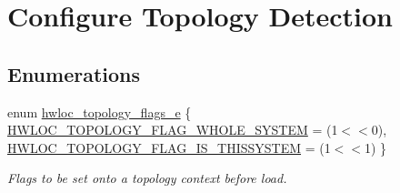 \hypertarget{group__hwlocality__configuration}{
\section{Configure Topology Detection}
\label{group__hwlocality__configuration}
}
\subsection*{Enumerations}
\begin{CompactItemize}
\item 
enum \hyperlink{group__hwlocality__configuration_gda025d3ec20b4b420f8038d23d6e7bde}{hwloc\_\-topology\_\-flags\_\-e} \{ \hyperlink{group__hwlocality__configuration_ggda025d3ec20b4b420f8038d23d6e7bde129b4fea1300be22bbaf0bb0958994c8}{HWLOC\_\-TOPOLOGY\_\-FLAG\_\-WHOLE\_\-SYSTEM} =  (1$<$$<$0), 
\hyperlink{group__hwlocality__configuration_ggda025d3ec20b4b420f8038d23d6e7bde6ecb6abc6a0bb75e81564f8bca85783b}{HWLOC\_\-TOPOLOGY\_\-FLAG\_\-IS\_\-THISSYSTEM} =  (1$<$$<$1)
 \}
\begin{CompactList}\small\item\em Flags to be set onto a topology context before load. \item\end{CompactList}\end{CompactItemize}

